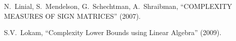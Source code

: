 \documentclass[handout]{beamer}
\begin{document}
\begin{frame}
    \begin{thebibliography}{XXXX}
         N.~Linial, S.~Mendelson, G.~Schechtman,
            A.~Shraibman, ``COMPLEXITY MEASURES OF SIGN MATRICES'' (2007).

         S.V.~Lokam, ``Complexity Lower Bounds using Linear
            Algebra'' (2009).
    \end{thebibliography}
\end{frame}
\end{document}
